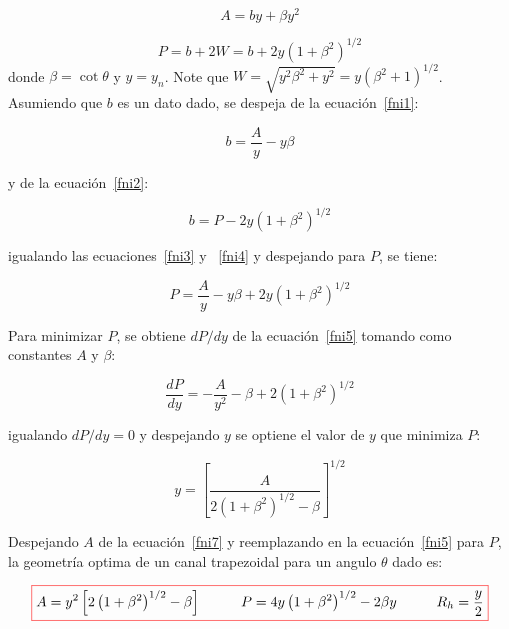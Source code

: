 \documentclass[11pt, oneside]{article}
\begin{document}
\begin{equation}
A = b y + \beta y^2
\label{fni1}
\end{equation}

\begin{equation}
P = b + 2W = b + 2y \left( 1+\beta^2 \right)^{1/2}
\label{fni2}
\end{equation}
donde $\beta = \cot \theta$ y $y=y_n$. Note que $W = \sqrt{y^2 \beta^2 + y^2}= y \left( \beta^2 +1 \right)^{1/2}$. Asumiendo que $b$ es un dato dado, se despeja de la ecuaci\'on~\ref{fni1}:

\begin{equation}
b = \frac{A}{y}- y\beta
\label{fni3}
\end{equation}

y de la ecuaci\'on~\ref{fni2}:

\begin{equation}
b = P -2y \left( 1+\beta^2 \right)^{1/2}
\label{fni4}
\end{equation}

igualando las ecuaciones~\ref{fni3} y ~\ref{fni4} y despejando para $P$, se tiene:

\begin{equation}
P = \frac{A}{y} - y\beta + 2y\left( 1+\beta^2 \right)^{1/2}
\label{fni5}
\end{equation}

Para minimizar $P$, se obtiene $dP/dy$ de la ecuaci\'on~\ref{fni5} tomando como constantes $A$ y $\beta$:

\begin{equation}
\frac{dP}{dy} = -\frac{A}{y^2} - \beta + 2\left( 1+\beta^2 \right)^{1/2}
\label{fni6}
\end{equation}

igualando $dP/dy=0$ y despejando $y$ se optiene el valor de $y$ que minimiza $P$:

\begin{equation}
y = \left[ \frac{A}{2\left( 1+\beta^2 \right)^{1/2} - \beta} \right]^{1/2}
\label{fni7}
\end{equation}

Despejando $A$ de la ecuaci\'on~\ref{fni7} y reemplazando en la ecuaci\'on~\ref{fni5} para $P$, la geometr\'ia optima de un canal trapezoidal para un angulo $\theta$ dado es:

\begin{equation}
\color{red}\boxed{\color{black} A = y^2 \left[ 2\left( 1 + \beta^2 \right)^{1/2} - \beta \right] \hspace{1cm} P=4y\left( 1 + \beta^2 \right)^{1/2} -2\beta y \hspace{1cm} R_h = \frac{y}{2}}
\label{fni8}
\end{equation}
\end{document}
